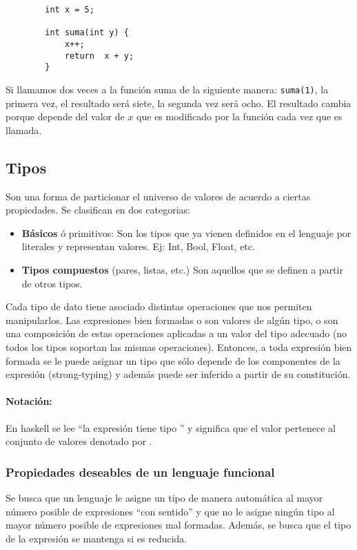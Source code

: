 \begin{centrado}
	\begin{verbatim}
		int x = 5;
		
		int suma(int y) {
			x++;
			return  x + y;
		}
	\end{verbatim}
\end{centrado}

Si llamamos dos veces a la función suma de la siguiente manera: \texttt{suma(1)}, la primera vez, el resultado será siete, la segunda vez será ocho. El resultado cambia porque depende del valor de $x$ que es modificado por la función cada vez que es llamada.

\subsection{Tipos}
Son una forma de particionar el universo de valores de acuerdo a ciertas propiedades. Se clasifican en dos categorias:
\begin{itemize}
	\item \textbf{Básicos} ó primitivos: Son los tipos que ya vienen definidos en el lenguaje por literales y representan valores. Ej: Int, Bool, Float, etc.
	\item \textbf{Tipos compuestos} (pares, listas, etc.) Son aquellos que se definen a partir de otros tipos.
\end{itemize}

Cada tipo de dato tiene asociado distintas operaciones que nos permiten manipularlos. Las expresiones bien formadas o son valores de algún tipo, o son una composición de estas operaciones aplicadas a un valor del tipo adecuado (no todos los tipos soportan las mismas operaciones). Entonces, a toda expresión bien formada se le puede asignar un tipo que sólo depende de los componentes de la expresión (strong-typing) y además puede ser inferido a partir de su constitución.

\paragraph{Notación:}   En haskell  se lee “la expresión  tiene tipo ” y significa que el valor  pertenece al conjunto de valores denotado por .

\subsubsection{Propiedades deseables de un lenguaje funcional}
Se busca que un lenguaje le asigne un tipo de manera automática al mayor número posible de expresiones ``con sentido'' y que no le asigne ningún tipo al mayor número posible de expresiones mal formadas. Además, se busca que el tipo de la expresión se mantenga si es reducida.

